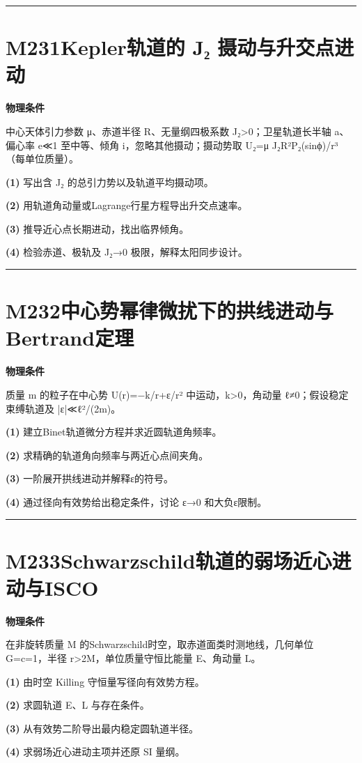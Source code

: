 \documentclass[UTF8,a4paper,11pt,oneside,openany]{ctexbook}
\begin{document}
\par\bigskip\hrule\bigskip
\section*{M231\quad Kepler轨道的 J₂ 摄动与升交点进动}
\textbf{物理条件}\par 中心天体引力参数 μ、赤道半径 R、无量纲四极系数 J₂>0；卫星轨道长半轴 a、偏心率 e≪1 至中等、倾角 i，忽略其他摄动；摄动势取 U₂=μ J₂R²P₂(sinϕ)/r³（每单位质量）。
\par\noindent\textbf{(1)} 写出含 J₂ 的总引力势以及轨道平均摄动项。
\par\noindent\textbf{(2)} 用轨道角动量或Lagrange行星方程导出升交点速率。
\par\noindent\textbf{(3)} 推导近心点长期进动，找出临界倾角。
\par\noindent\textbf{(4)} 检验赤道、极轨及 J₂→0 极限，解释太阳同步设计。

\par\bigskip\hrule\bigskip
\section*{M232\quad 中心势幂律微扰下的拱线进动与Bertrand定理}
\textbf{物理条件}\par 质量 m 的粒子在中心势 U(r)=−k/r+ε/r² 中运动，k>0，角动量 ℓ≠0；假设稳定束缚轨道及 |ε|≪ℓ²/(2m)。
\par\noindent\textbf{(1)} 建立Binet轨道微分方程并求近圆轨道角频率。
\par\noindent\textbf{(2)} 求精确的轨道角向频率与两近心点间夹角。
\par\noindent\textbf{(3)} 一阶展开拱线进动并解释ε的符号。
\par\noindent\textbf{(4)} 通过径向有效势给出稳定条件，讨论 ε→0 和大负ε限制。

\par\bigskip\hrule\bigskip
\section*{M233\quad Schwarzschild轨道的弱场近心进动与ISCO}
\textbf{物理条件}\par 在非旋转质量 M 的Schwarzschild时空，取赤道面类时测地线，几何单位 G=c=1，半径 r>2M，单位质量守恒比能量 E、角动量 L。
\par\noindent\textbf{(1)} 由时空 Killing 守恒量写径向有效势方程。
\par\noindent\textbf{(2)} 求圆轨道 E、L 与存在条件。
\par\noindent\textbf{(3)} 从有效势二阶导出最内稳定圆轨道半径。
\par\noindent\textbf{(4)} 求弱场近心进动主项并还原 SI 量纲。
\end{document}
